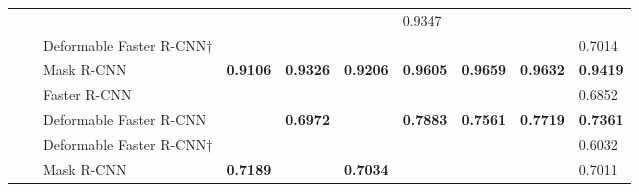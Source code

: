 \documentclass{ieeeaccess}
\begin{document}
\begin{table*}
\begin{tabularx}{\linewidth}{|u|u|t|v|v|k|v|v|k|k|}
        \footnotesize {}&
        \footnotesize {}&
        \footnotesize {}&
        \footnotesize {}&
        \footnotesize {}&
        \footnotesize {}&
        \footnotesize {0.9347} \\
         & &\footnotesize  Deformable Faster R-CNN$\dagger$&
        \footnotesize {}&
        \footnotesize {}&
        \footnotesize {}&
        \footnotesize {}&
        \footnotesize {}&
        \footnotesize {}&
        \footnotesize {0.7014} \\
        & &\footnotesize  Mask R-CNN&
        \footnotesize \centering \textbf{0.9106}&
        \footnotesize \centering \textbf{0.9326}&
        \footnotesize \centering \textbf{0.9206}&
        \footnotesize \centering \textbf{0.9605}&
        \footnotesize \centering \textbf{0.9659}&
        \footnotesize \centering \textbf{0.9632}&
        \footnotesize \textbf{0.9419} \\
        & \footnotesize {}&
        \footnotesize  Faster R-CNN&
        \footnotesize {}&
        \footnotesize {}&
        \footnotesize {}&
        \footnotesize {}&
        \footnotesize {}&
        \footnotesize {}&
        \footnotesize 
        {0.6852} \\
        & &\footnotesize  Deformable Faster R-CNN &
        \footnotesize {}&
        \footnotesize \centering \textbf{0.6972}&
        \footnotesize {}&
        \footnotesize \centering \textbf{0.7883}&
        \footnotesize \centering \textbf{0.7561}&
        \footnotesize \centering \textbf{0.7719}&
        \footnotesize \textbf{0.7361} \\
         & &\footnotesize  Deformable Faster R-CNN$\dagger$&
        \footnotesize {}&
        \footnotesize {}&
        \footnotesize {}&
        \footnotesize {}&
        \footnotesize {}&
        \footnotesize {}&
        \footnotesize {0.6032} \\
        & &\footnotesize  Mask R-CNN&
        \footnotesize \centering \textbf{0.7189}&
        \footnotesize {}&
        \footnotesize \centering \textbf{0.7034}&
        \footnotesize {}&
        \footnotesize {}&
        \footnotesize {}&
        \footnotesize 
        {0.7011} \\
        

\end{tabularx}
\end{table*}
\end{document}
